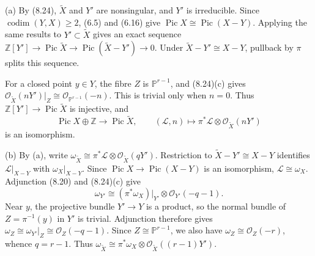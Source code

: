 (a) By (8.24), $\widetilde X$ and $Y'$ are nonsingular, and $Y'$ is irreducible. Since $\operatorname{codim}(Y,X)\ge2$, (6.5) and (6.16) give $\operatorname{Pic}X\cong\operatorname{Pic}(X-Y)$. Applying the same results to $Y'\subset\widetilde X$ gives an exact sequence $\mathbb Z[Y']\to\operatorname{Pic}\widetilde X\to\operatorname{Pic}(\widetilde X-Y')\to0$. Under $\widetilde X-Y'\cong X-Y$, pullback by $\pi$ splits this sequence.

For a closed point $y\in Y$, the fibre $Z$ is $\mathbb P^{r-1}$, and (8.24)(c) gives $\mathcal O_{\widetilde X}(nY')|_Z\cong\mathcal O_{\mathbb P^{r-1}}(-n)$. This is trivial only when $n=0$. Thus $\mathbb Z[Y']\to\operatorname{Pic}\widetilde X$ is injective, and
\[\operatorname{Pic}X\oplus\mathbb Z\to\operatorname{Pic}\widetilde X,\qquad(\mathcal L,n)\mapsto\pi^*\mathcal L\otimes\mathcal O_{\widetilde X}(nY')\]
is an isomorphism.

(b) By (a), write $\omega_{\widetilde X}\cong\pi^*\mathcal L\otimes\mathcal O_{\widetilde X}(qY')$. Restriction to $\widetilde X-Y'\cong X-Y$ identifies $\mathcal L|_{X-Y}$ with $\omega_X|_{X-Y}$. Since $\operatorname{Pic}X\to\operatorname{Pic}(X-Y)$ is an isomorphism, $\mathcal L\cong\omega_X$. Adjunction (8.20) and (8.24)(c) give
\[\omega_{Y'}\cong(\pi^*\omega_X)|_{Y'}\otimes\mathcal O_{Y'}(-q-1).\]
Near $y$, the projective bundle $Y'\to Y$ is a product, so the normal bundle of $Z=\pi^{-1}(y)$ in $Y'$ is trivial. Adjunction therefore gives $\omega_Z\cong\omega_{Y'}|_Z\cong\mathcal O_Z(-q-1)$. Since $Z\cong\mathbb P^{r-1}$, we also have $\omega_Z\cong\mathcal O_Z(-r)$, whence $q=r-1$. Thus $\omega_{\widetilde X}\cong\pi^*\omega_X\otimes\mathcal O_{\widetilde X}((r-1)Y')$.
